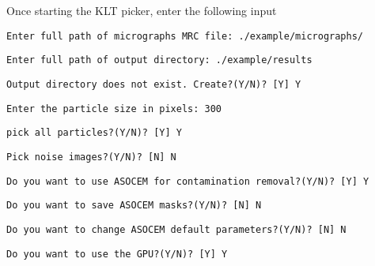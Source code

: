 \documentclass[12pt,a4paper]{article}
\begin{document}
Once starting the KLT picker, enter the following input
\begin{flushleft}
	\texttt{Enter full path of micrographs MRC file: ./example/micrographs/}
\end{flushleft}
\begin{flushleft}
	\texttt{Enter full path of output directory: ./example/results}
\end{flushleft}
\begin{flushleft}
	\texttt{Output directory does not exist. Create?(Y/N)? [Y] Y}
\end{flushleft}
\begin{flushleft}
	\texttt{Enter the particle size in pixels: 300}
\end{flushleft}
\begin{flushleft}
	\texttt{pick all particles?(Y/N)? [Y]  Y}
\end{flushleft}
\begin{flushleft}
	\texttt{Pick noise images?(Y/N)? [N] N}
\end{flushleft}
\begin{flushleft}
	\texttt{Do you want to use ASOCEM for contamination removal?(Y/N)? [Y] Y }
\end{flushleft}
\begin{flushleft}
	\texttt{Do you want to save ASOCEM masks?(Y/N)? [N] N}
\end{flushleft}
\begin{flushleft}
	\texttt{Do you want to change ASOCEM default parameters?(Y/N)? [N] N}
\end{flushleft}
\begin{flushleft}
	\texttt{Do you want to use the GPU?(Y/N)? [Y] Y}
\end{flushleft}
\end{document}
